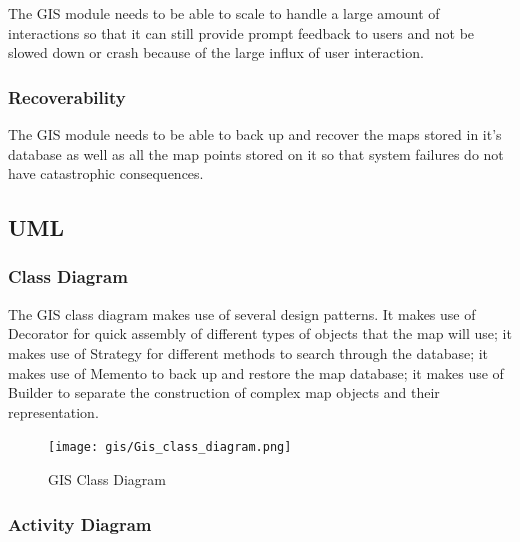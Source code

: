 The GIS module needs to be able to scale to handle a large amount of interactions so that it can still provide prompt feedback to users and not be slowed down or crash because of the large influx of user interaction.



\subsubsection{Recoverability}

The GIS module needs to be able to back up and recover the maps stored in it's database as well as all the map points stored on it so that system failures do not have catastrophic consequences.



\pagebreak

\subsection{UML}

\subsubsection{Class Diagram}

The GIS class diagram makes use of several design patterns. It makes use of Decorator for quick assembly of different types of objects that the map will use; it makes use of Strategy for different methods to search through the database; it makes use of Memento to back up and restore the map database; it makes use of Builder to separate the construction of complex map objects and their representation.



\begin{figure}[H]

	\centering

	\texttt{[image: gis/Gis\_class\_diagram.png]}

	\caption{GIS Class Diagram}

\end{figure}








\pagebreak

\subsubsection{Activity Diagram}

